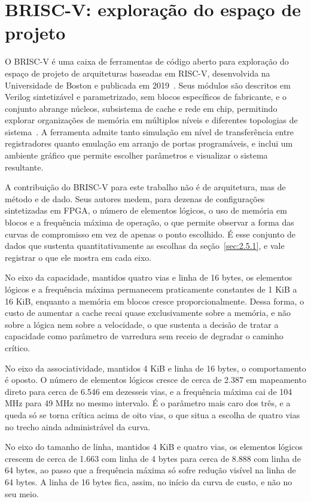 \section{BRISC-V: exploração do espaço de projeto}\label{sec:3.3}

O BRISC-V é uma caixa de ferramentas de código aberto para exploração do espaço de projeto de arquiteturas baseadas em RISC-V, desenvolvida na Universidade de Boston e publicada em 2019~\cite{bandara2019briscv}. Seus módulos são descritos em Verilog sintetizável e parametrizado, sem blocos específicos de fabricante, e o conjunto abrange núcleos, subsistema de cache e rede em chip, permitindo explorar organizações de memória em múltiplos níveis e diferentes topologias de sistema~\cite{bandara2019briscv}. A ferramenta admite tanto simulação em nível de transferência entre registradores quanto emulação em arranjo de portas programáveis, e inclui um ambiente gráfico que permite escolher parâmetros e visualizar o sistema resultante.

A contribuição do BRISC-V para este trabalho não é de arquitetura, mas de método e de dado. Seus autores medem, para dezenas de configurações sintetizadas em FPGA, o número de elementos lógicos, o uso de memória em blocos e a frequência máxima de operação, o que permite observar a forma das curvas de compromisso em vez de apenas o ponto escolhido. É esse conjunto de dados que sustenta quantitativamente as escolhas da seção~\ref{sec:2.5.1}, e vale registrar o que ele mostra em cada eixo.

No eixo da capacidade, mantidos quatro vias e linha de 16 bytes, os elementos lógicos e a frequência máxima permanecem praticamente constantes de 1 KiB a 16 KiB, enquanto a memória em blocos cresce proporcionalmente. Dessa forma, o custo de aumentar a cache recai quase exclusivamente sobre a memória, e não sobre a lógica nem sobre a velocidade, o que sustenta a decisão de tratar a capacidade como parâmetro de varredura sem receio de degradar o caminho crítico.

No eixo da associatividade, mantidos 4 KiB e linha de 16 bytes, o comportamento é oposto. O número de elementos lógicos cresce de cerca de 2.387 em mapeamento direto para cerca de 6.546 em dezesseis vias, e a frequência máxima cai de 104 MHz para 49 MHz no mesmo intervalo. É o parâmetro mais caro dos três, e a queda só se torna crítica acima de oito vias, o que situa a escolha de quatro vias no trecho ainda administrável da curva.

No eixo do tamanho de linha, mantidos 4 KiB e quatro vias, os elementos lógicos crescem de cerca de 1.663 com linha de 4 bytes para cerca de 8.888 com linha de 64 bytes, ao passo que a frequência máxima só sofre redução visível na linha de 64 bytes. A linha de 16 bytes fica, assim, no início da curva de custo, e não no seu meio.

